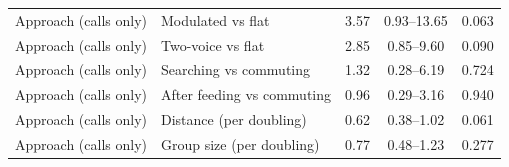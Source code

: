 \begin{table}[!ht]
\begin{tabular}{llccc}
Approach (calls only) & Modulated vs flat & 3.57 & 0.93--13.65 & 0.063 \\
Approach (calls only) & Two-voice vs flat & 2.85 & 0.85--9.60 & 0.090 \\
Approach (calls only) & Searching vs commuting & 1.32 & 0.28--6.19 & 0.724 \\
Approach (calls only) & After feeding vs commuting & 0.96 & 0.29--3.16 & 0.940 \\
Approach (calls only) & Distance (per doubling) & 0.62 & 0.38--1.02 & 0.061 \\
Approach (calls only) & Group size (per doubling) & 0.77 & 0.48--1.23 & 0.277 \\
\bottomrule
\end{tabular}
\end{table}